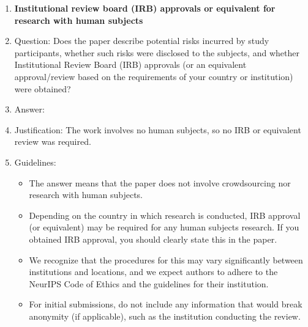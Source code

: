 \begin{enumerate}
\item {\bf Institutional review board (IRB) approvals or equivalent for research with human subjects}
    \item[] Question: Does the paper describe potential risks incurred by study participants, whether such risks were disclosed to the subjects, and whether Institutional Review Board (IRB) approvals (or an equivalent approval/review based on the requirements of your country or institution) were obtained?
    \item[] Answer: \answerNA{}
    \item[] Justification: The work involves no human subjects, so no IRB or equivalent review was required.
    \item[] Guidelines:
    \begin{itemize}
        \item The answer \answerNA{} means that the paper does not involve crowdsourcing nor research with human subjects.
        \item Depending on the country in which research is conducted, IRB approval (or equivalent) may be required for any human subjects research. If you obtained IRB approval, you should clearly state this in the paper. 
        \item We recognize that the procedures for this may vary significantly between institutions and locations, and we expect authors to adhere to the NeurIPS Code of Ethics and the guidelines for their institution. 
        \item For initial submissions, do not include any information that would break anonymity (if applicable), such as the institution conducting the review.
    \end{itemize}


\end{enumerate}
